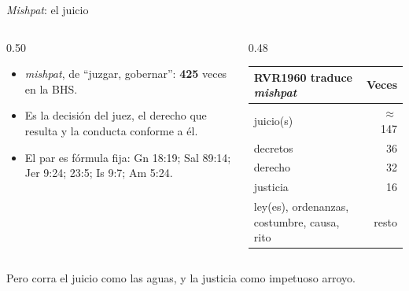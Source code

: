 \begin{frame}{\emph{Mishpat}: el juicio}
\begin{columns}[c,onlytextwidth]
\begin{column}{0.50\textwidth}\small
\begin{itemize}
\item {} \emph{mishpat}, de  ``juzgar, gobernar'': \textbf{425} veces en la BHS.
\item Es la decisión del juez, el derecho que resulta y la conducta conforme a él.
\item El par  es fórmula fija: Gn 18:19; Sal 89:14; Jer 9:24; 23:5; Is 9:7; Am 5:24.
\end{itemize}
\end{column}
\begin{column}{0.48\textwidth}
\scriptsize\renewcommand{\arraystretch}{1.12}
\begin{tabular}{@{}>{\RaggedRight\arraybackslash}p{3.0cm}r@{}}
\toprule
\textbf{RVR1960 traduce \emph{mishpat}} & \textbf{Veces} \\ \midrule
juicio(s) & $\approx$147 \\
decretos & 36 \\
derecho & 32 \\
justicia & 16 \\
ley(es), ordenanzas, costumbre, causa, rito & resto \\
\bottomrule
\end{tabular}
\end{column}
\end{columns}\par\medskip
\begin{cita}Pero corra el juicio como las aguas, y la justicia como impetuoso arroyo.\end{cita}
\end{frame}

